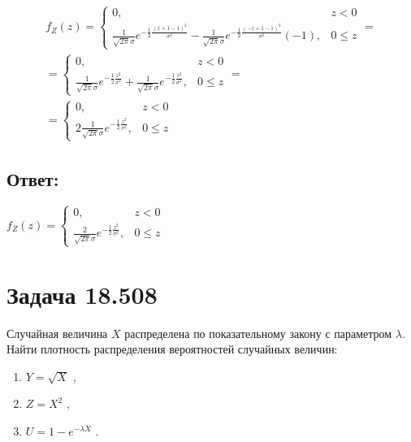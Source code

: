 \begin{multline}
    f_Z(z)
    = \left \{
    \begin{array}{ll}
        0,                                                                                                                                                                                                & z < 0    \\
        \frac{1}{\sqrt{2 \pi} \sigma} e^{-\frac{1}{2} \frac{\left ( z + 1 - 1 \right )^2}{\sigma^2}} - \frac{1}{\sqrt{2 \pi} \sigma} e^{-\frac{1}{2} \frac{\left ( -z + 1 - 1 \right )^2}{\sigma^2}}(-1), & 0 \leq z
    \end{array}
    \right . = \\
    = \left \{
    \begin{array}{ll}
        0,                                                                                                                                         & z < 0    \\
        \frac{1}{\sqrt{2 \pi} \sigma} e^{-\frac{1}{2} \frac{z^2}{\sigma^2}} + \frac{1}{\sqrt{2 \pi} \sigma} e^{-\frac{1}{2} \frac{z^2}{\sigma^2}}, & 0 \leq z
    \end{array}
    \right . = \\
    = \left \{
    \begin{array}{ll}
        0,                                                                     & z < 0    \\
        2 \frac{1}{\sqrt{2 \pi} \sigma} e^{-\frac{1}{2} \frac{z^2}{\sigma^2}}, & 0 \leq z
    \end{array}
    \right .
\end{multline}

\subsection*{Ответ:}
$
f_Z(z)
= \left \{
\begin{array}{ll}
    0,                                                                   & z < 0    \\
    \frac{2}{\sqrt{2 \pi} \sigma} e^{-\frac{1}{2} \frac{z^2}{\sigma^2}}, & 0 \leq z
\end{array}
\right .
$

\section*{Задача 18.508}

Случайная величина $X$ распределена по показательному закону с параметром $\lambda$. Найти плотность распределения вероятностей случайных величин:
\begin{enumerate}
    \item $Y = \sqrt{X}$ ,
    \item $Z = X^2$ ,
    \item $U = 1 - e^{-\lambda X}$ .
\end{enumerate}

